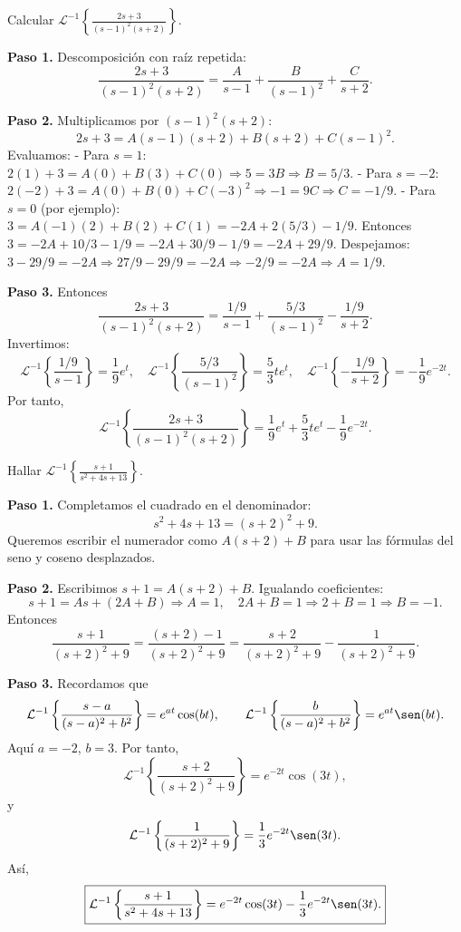 \begin{example}
Calcular $\mathcal{L}^{-1}\left\{\frac{2s+3}{(s-1)^2(s+2)}\right\}$.
\begin{myproof}
\textbf{Paso 1.} Descomposición con raíz repetida:
\[
\frac{2s+3}{(s-1)^2(s+2)} = \frac{A}{s-1} + \frac{B}{(s-1)^2} + \frac{C}{s+2}.
\]

\textbf{Paso 2.} Multiplicamos por $(s-1)^2(s+2)$:
\[
2s+3 = A(s-1)(s+2) + B(s+2) + C(s-1)^2.
\]
Evaluamos:
- Para $s=1$: $2(1)+3 = A(0)+B(3)+C(0) \Rightarrow 5 = 3B \Rightarrow B=5/3$.
- Para $s=-2$: $2(-2)+3 = A(0)+B(0)+C(-3)^2 \Rightarrow -1 = 9C \Rightarrow C=-1/9$.
- Para $s=0$ (por ejemplo): $3 = A(-1)(2) + B(2) + C(1) = -2A + 2(5/3) - 1/9$.
  Entonces $3 = -2A + 10/3 - 1/9 = -2A + 30/9 - 1/9 = -2A + 29/9$.
  Despejamos: $3 - 29/9 = -2A \Rightarrow 27/9 - 29/9 = -2A \Rightarrow -2/9 = -2A \Rightarrow A=1/9$.

\textbf{Paso 3.} Entonces
\[
\frac{2s+3}{(s-1)^2(s+2)} = \frac{1/9}{s-1} + \frac{5/3}{(s-1)^2} - \frac{1/9}{s+2}.
\]
Invertimos:
\[
\mathcal{L}^{-1}\left\{\frac{1/9}{s-1}\right\} = \frac{1}{9}e^{t},\quad
\mathcal{L}^{-1}\left\{\frac{5/3}{(s-1)^2}\right\} = \frac{5}{3} t e^{t},\quad
\mathcal{L}^{-1}\left\{-\frac{1/9}{s+2}\right\} = -\frac{1}{9}e^{-2t}.
\]
Por tanto,
\[
\boxed{\mathcal{L}^{-1}\left\{\frac{2s+3}{(s-1)^2(s+2)}\right\} = \frac{1}{9}e^{t} + \frac{5}{3}t e^{t} - \frac{1}{9}e^{-2t}.}
\]
\end{myproof}
\end{example}

\begin{example}
Hallar $\mathcal{L}^{-1}\left\{\frac{s+1}{s^2+4s+13}\right\}$.
\begin{myproof}
\textbf{Paso 1.} Completamos el cuadrado en el denominador:
\[
s^2+4s+13 = (s+2)^2 + 9.
\]
Queremos escribir el numerador como $A(s+2)+B$ para usar las fórmulas del seno y coseno desplazados.

\textbf{Paso 2.} Escribimos $s+1 = A(s+2)+B$. Igualando coeficientes:
\[
s+1 = A s + (2A+B) \Rightarrow A=1,\quad 2A+B=1 \Rightarrow 2+B=1 \Rightarrow B=-1.
\]
Entonces
\[
\frac{s+1}{(s+2)^2+9} = \frac{(s+2) - 1}{(s+2)^2+9} = \frac{s+2}{(s+2)^2+9} - \frac{1}{(s+2)^2+9}.
\]

\textbf{Paso 3.} Recordamos que
\[
\mathcal{L}^{-1}\left\{\frac{s-a}{(s-a)^2+b^2}\right\} = e^{at}\cos(bt),\qquad
\mathcal{L}^{-1}\left\{\frac{b}{(s-a)^2+b^2}\right\} = e^{at}\sen(bt).
\]
Aquí $a=-2$, $b=3$. Por tanto,
\[
\mathcal{L}^{-1}\left\{\frac{s+2}{(s+2)^2+9}\right\} = e^{-2t}\cos(3t),
\]
y
\[
\mathcal{L}^{-1}\left\{\frac{1}{(s+2)^2+9}\right\} = \frac{1}{3}e^{-2t}\sen(3t).
\]
Así,
\[
\boxed{\mathcal{L}^{-1}\left\{\frac{s+1}{s^2+4s+13}\right\} = e^{-2t}\cos(3t) - \frac{1}{3}e^{-2t}\sen(3t).}
\]
\end{myproof}
\end{example}

